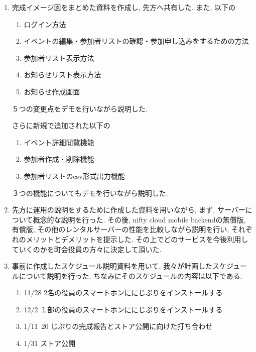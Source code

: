 \begin{enumerate}
    \item 完成イメージ図をまとめた資料を作成し, 先方へ共有した. また, 以下の
    \begin{enumerate}
        \item ログイン方法
        \item イベントの編集・参加者リストの確認・参加申し込みをするための方法
        \item 参加者リスト表示方法
        \item お知らせリスト表示方法
        \item お知らせ作成画面
    \end{enumerate}
    ５つの変更点をデモを行いながら説明した.

    さらに新規で追加された以下の
    \begin{enumerate}
        \item イベント詳細閲覧機能
        \item 参加者作成・削除機能
        \item 参加者リストのcsv形式出力機能
    \end{enumerate}
    ３つの機能についてもデモを行いながら説明した.

    \item 先方に運用の説明をするために作成した資料を用いながら, まず, サーバーについて概念的な説明を行った.
    その後, nifty cloud mobile backendの無償版, 有償版, その他のレンタルサーバーの性能を比較しながら説明を行い, それぞれのメリットとデメリットを提示した.
    その上でどのサービスを今後利用していくのかを町会役員の方々に決定して頂いた.

    \item 事前に作成したスケジュール説明資料を用いて, 我々が計画したスケジュールについて説明を行った. ちなみにそのスケジュールの内容は以下である.
    \begin{enumerate}
        \item 11/28 2名の役員のスマートホンににじぷりをインストールする
        \item 12/2 １部の役員のスマートホンににじぷりをインストールする
        \item 1/11~20 じぷりの完成報告とストア公開に向けた打ち合わせ
        \item 1/31 ストア公開
    \end{enumerate}
\end{enumerate}


